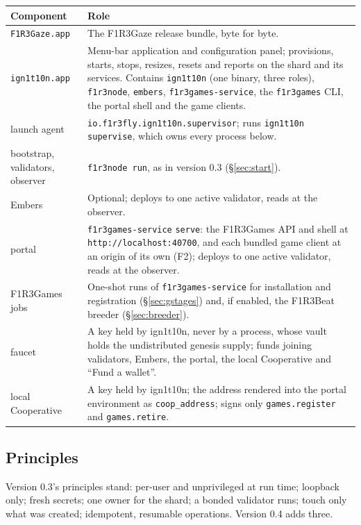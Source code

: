 \documentclass[11pt]{article}
\theoremstyle{definition}
\theoremstyle{remark}
\newcommand{\code}[1]{\texttt{#1}}
\newcommand{\Gz}{F1R3Gaze}
\newcommand{\Hr}{ign1t10n}
\newcommand{\Gm}{F1R3Games}
\newcommand{\Svc}{\code{f1r3games-service}}
\newcommand{\Em}{Embers}
\begin{document}
\begin{center}\small
\renewcommand{\arraystretch}{1.15}
\begin{tabularx}{\linewidth}{@{}p{3.3cm}X@{}}
\toprule
Component & Role\\
\midrule
\code{F1R3Gaze.app} & The \Gz{} release bundle, byte for byte.\\
\code{ign1t10n.app} & Menu-bar application and configuration panel; provisions, starts, stops, resizes, resets and reports on the shard and its services. Contains \code{ign1t10n} (one binary, three roles), \code{f1r3node}, \code{embers}, \code{f1r3games-service}, the \code{f1r3games} CLI, the portal shell and the game clients.\\
launch agent & \code{io.f1r3fly.ign1t10n.supervisor}; runs \code{ign1t10n supervise}, which owns every process below.\\
bootstrap, validators, observer & \code{f1r3node run}, as in version 0.3 (\S\ref{sec:start}).\\
\Em{} & Optional; deploys to one active validator, reads at the observer.\\
portal & \Svc{} \code{serve}: the \Gm{} API and shell at \code{http://localhost:40700}, and each bundled game client at an origin of its own (F2); deploys to one active validator, reads at the observer.\\
\Gm{} jobs & One-shot runs of \Svc{} for installation and registration (\S\ref{sec:gstages}) and, if enabled, the F1R3Beat breeder (\S\ref{sec:breeder}).\\
faucet & A key held by \Hr{}, never by a process, whose vault holds the undistributed genesis supply; funds joining validators, \Em{}, the portal, the local Cooperative and ``Fund a wallet''.\\
local Cooperative & A key held by \Hr{}; the address rendered into the portal environment as \code{coop\_address}; signs only \code{games.register} and \code{games.retire}.\\
\bottomrule
\end{tabularx}
\end{center}

\subsection{Principles}

Version 0.3's principles stand: per-user and unprivileged at run time; loopback
only; fresh secrets; one owner for the shard; a bonded validator runs; touch only
what was created; idempotent, resumable operations. Version 0.4 adds three.
\end{document}
